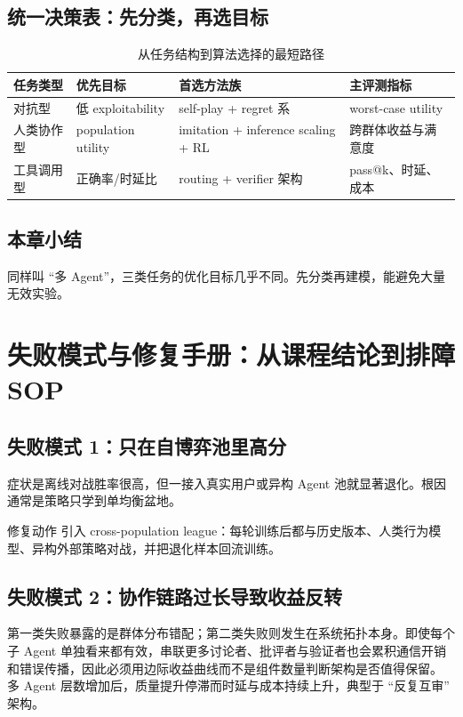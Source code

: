 \documentclass[a4paper]{article}
\begin{document}
\subsection{统一决策表：先分类，再选目标}
\begin{table}[H]
\centering
\begin{tabular}{p{3.1cm}p{3.4cm}p{3.2cm}p{3.2cm}}
\toprule
\textbf{任务类型} & \textbf{优先目标} & \textbf{首选方法族} & \textbf{主评测指标} \\
\midrule
对抗型 & 低 exploitability & self-play + regret 系 & worst-case utility \\
人类协作型 & population utility & imitation + inference scaling + RL & 跨群体收益与满意度 \\
工具调用型 & 正确率/时延比 & routing + verifier 架构 & pass@k、时延、成本 \\
\bottomrule
\end{tabular}
\caption{从任务结构到算法选择的最短路径}
\end{table}

\subsection{本章小结}
同样叫 ``多 Agent''，三类任务的优化目标几乎不同。先分类再建模，能避免大量无效实验。

\section{失败模式与修复手册：从课程结论到排障 SOP}

\subsection{失败模式 1：只在自博弈池里高分}
症状是离线对战胜率很高，但一接入真实用户或异构 Agent 池就显著退化。根因通常是策略只学到单均衡盆地。

\begin{importantbox}{修复动作}
引入 cross-population league：每轮训练后都与历史版本、人类行为模型、异构外部策略对战，并把退化样本回流训练。
\end{importantbox}

\subsection{失败模式 2：协作链路过长导致收益反转}
第一类失败暴露的是群体分布错配；第二类失败则发生在系统拓扑本身。即使每个子 Agent 单独看来都有效，串联更多讨论者、批评者与验证者也会累积通信开销和错误传播，因此必须用边际收益曲线而不是组件数量判断架构是否值得保留。
多 Agent 层数增加后，质量提升停滞而时延与成本持续上升，典型于 ``反复互审'' 架构。
\end{document}
